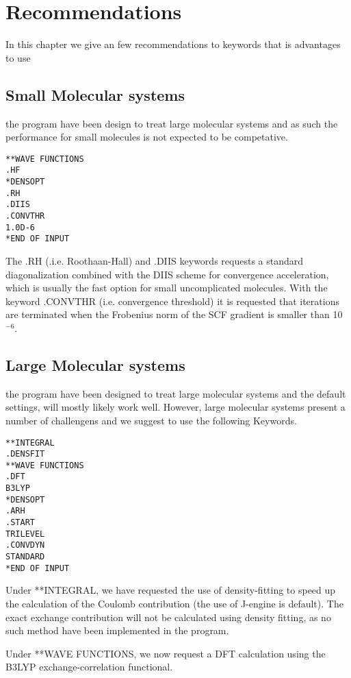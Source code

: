 \chapter{Recommendations }\label{recommendations}

In this chapter we give an few recommendations to keywords that is advantages to use 

\section{Small Molecular systems}

the {\lsdalton} program have been design to treat large molecular systems and as such the performance for small molecules is not expected to be competative.
\begin{verbatim}
**WAVE FUNCTIONS
.HF
*DENSOPT
.RH
.DIIS
.CONVTHR
1.0D-6
*END OF INPUT
\end{verbatim}
The .RH (.i.e. Roothaan-Hall) and .DIIS keywords requests a standard diagonalization combined with the DIIS scheme for convergence acceleration, which is usually the fast option for small uncomplicated molecules. 
With the keyword .CONVTHR (i.e. convergence threshold) it is requested that iterations are terminated when the Frobenius norm of the SCF gradient is smaller than 10$^{-6}$. 

\section{Large Molecular systems}

the {\lsdalton} program have been designed to treat large molecular systems and the default 
settings, will mostly likely work well. However, large molecular systems present a number of 
challengens and we suggest to use the following Keywords.

\begin{verbatim}
**INTEGRAL
.DENSFIT
**WAVE FUNCTIONS
.DFT
B3LYP
*DENSOPT
.ARH
.START
TRILEVEL
.CONVDYN
STANDARD
*END OF INPUT
\end{verbatim}
Under **INTEGRAL, we have requested the use of density-fitting to speed up the calculation of 
the Coulomb contribution (the use of J-engine is default). The exact exchange contribution will not 
be calculated using density fitting, as no such method have been implemented in the {\lsdalton} program.

Under **WAVE FUNCTIONS, we now request a DFT
calculation using the B3LYP exchange-correlation functional.

